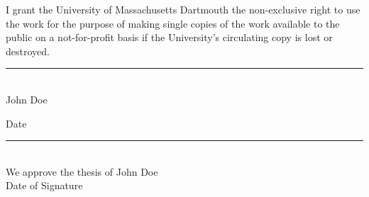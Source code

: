 \def\spacer{1.1cm}

\thispagestyle{empty} 
\rule{0mm}{2.3in}

{
\noindent I grant the University of Massachusetts Dartmouth the non-exclusive right to use the work for the purpose of making single copies of the work available to the public on a not-for-profit basis if the University's circulating copy is lost or destroyed. \par}

\vspace{0.9in}

\hspace{6.8cm}\rule{3in}{.2pt}\\
\phantom{1}\hspace{7.2cm}John Doe %

\vspace{1cm}

\phantom{1}\hspace{6.8cm}Date
\rule{2.7in}{.2pt}\\

\newpage 
\thispagestyle{empty} 
\noindent We approve the thesis of John Doe \\
\phantom{1}\hspace{10.4cm}Date of Signature\\

\vspace{0.3cm}


